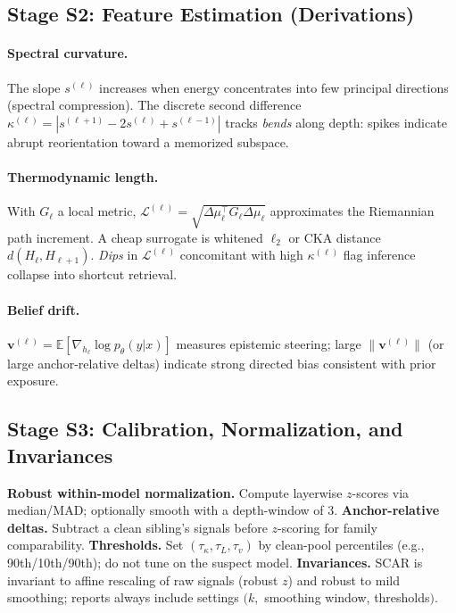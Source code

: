\documentclass[11pt]{article}
\begin{document}
\subsection{Stage S2: Feature Estimation (Derivations)}
\paragraph{Spectral curvature.}
The slope $s^{(\ell)}$ increases when energy concentrates into few principal directions (spectral compression). The discrete second difference
$\kappa^{(\ell)}=|s^{(\ell+1)}-2s^{(\ell)}+s^{(\ell-1)}|$ tracks \emph{bends} along depth: spikes indicate abrupt reorientation toward a memorized subspace.

\paragraph{Thermodynamic length.}
With $G_\ell$ a local metric, $\mathcal{L}^{(\ell)}=\sqrt{\Delta\mu_\ell^\top G_\ell \Delta\mu_\ell}$ approximates the Riemannian path increment. A cheap surrogate is whitened $\ell_2$ or CKA distance $d(H_\ell,H_{\ell+1})$. \emph{Dips} in $\mathcal{L}^{(\ell)}$ concomitant with high $\kappa^{(\ell)}$ flag inference collapse into shortcut retrieval.

\paragraph{Belief drift.}
$\mathbf{v}^{(\ell)}=\mathbb{E}[\nabla_{h_\ell}\log p_\theta(y|x)]$ measures epistemic steering; large $\|\mathbf{v}^{(\ell)}\|$ (or large anchor-relative deltas) indicate strong directed bias consistent with prior exposure.

\subsection{Stage S3: Calibration, Normalization, and Invariances}
\label{subsec:scar-calib}
\textbf{Robust within-model normalization.} Compute layerwise $z$-scores via median/MAD; optionally smooth with a depth-window of $3$.  
\textbf{Anchor-relative deltas.} Subtract a clean sibling’s signals before $z$-scoring for family comparability.  
\textbf{Thresholds.} Set $(\tau_\kappa,\tau_L,\tau_v)$ by clean-pool percentiles (e.g., 90th/10th/90th); do not tune on the suspect model.  
\textbf{Invariances.} SCAR is invariant to affine rescaling of raw signals (robust $z$) and robust to mild smoothing; reports always include settings $(k,$ smoothing window, thresholds$)$.
\end{document}
